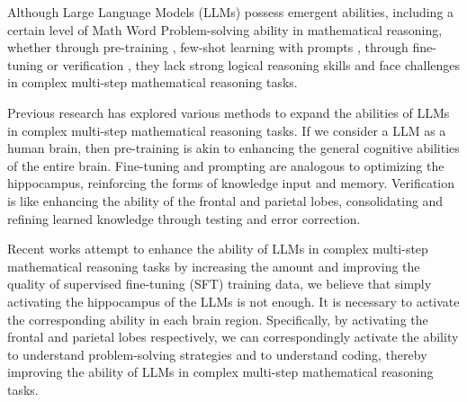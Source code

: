 \documentclass[11pt]{article}
\begin{document}
Although Large Language Models (LLMs) possess emergent abilities, including a certain level of Math Word Problem-solving ability in mathematical reasoning, whether through pre-training \citep{touvronLLaMAOpenEfficient2023, roziereCodeLlamaOpen2023, openaiGPT4TechnicalReport2023, anilPaLMTechnicalReport2023}, few-shot learning with prompts \citep{zhangCR2023, zhengPHP2023, zhuRules2023, wangPlanandSolvePromptingImproving2023}, through fine-tuning \citep{wangMathCoderSeamlessCode2023,yuanSCALINGRELATIONSHIPLEARNING2023,luoWizardMath2023} or verification \citep{dengUnifiedViewAnswer2023, wuGetMathProgressive2023,wangMathShepherdLabelFreeStepbyStep2023,romera-paredesMathematicalDiscoveriesProgram2023}, they lack strong logical reasoning skills and face challenges in complex multi-step mathematical reasoning tasks.

Previous research has explored various methods to expand the abilities of LLMs in complex multi-step mathematical reasoning tasks. If we consider a LLM as a human brain, then pre-training is akin to enhancing the general cognitive abilities of the entire brain. Fine-tuning and prompting  are analogous to optimizing the hippocampus, reinforcing the forms of knowledge input and memory. Verification is like enhancing the ability of the frontal and parietal lobes, consolidating and refining learned knowledge through testing and error correction.

Recent works \citep{yueMAmmoTHBuildingMath2023, gouToRAToolIntegratedReasoning2023, yuMetaMathBootstrapYour2023} attempt to enhance the ability of LLMs in complex multi-step mathematical reasoning tasks by increasing the amount and improving the quality of supervised fine-tuning (SFT) training data, we believe that simply activating the hippocampus of the LLMs is not enough. It is necessary to activate the corresponding ability in each brain region. Specifically, by activating the frontal and parietal lobes respectively, we can correspondingly activate the ability to understand problem-solving strategies and to understand coding, thereby improving the ability of LLMs in complex multi-step mathematical reasoning tasks.
\end{document}
